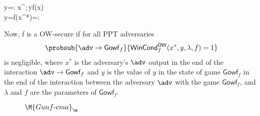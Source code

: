 \medskip

\hspace{1cm}
{\pcif y=\bot: x\sample\bin^\lambda;\,y\gets f(x)\\
\pcif y=f(x^*)=\lambda: \\
\pcelse {}
}

\medskip
\noindent
Now, f is a OW-secure if for all PPT adversaries
\[\probsub{\adv\rightarrow\mathsf{Gowf}_f}{\mathsf{WinCond}_f^\mathsf{OW}(x^*,y,\lambda,f)=1}\]
is negligible, where $x^*$ is the adversary's $\adv$ output in the end of the interaction $\adv\rightarrow\textsf{Gowf}_f$ and $y$ is the value of $y$ in the state of game $\mathsf{Gowf}_f$ in the end of the interaction
between the adversary $\adv$ with the game $\mathsf{Gowf}_f$, and $\lambda$ and $f$ are the parameters of $\mathsf{Gowf}_f$.

\begin{wrapfigure}{R}{0.215\textwidth}
\vspace{-0.7cm}
				\begin{pchstack}
\pchspace
				\begin{pcvstack}
          \underline{\underline{$\M{Gunf\text{-}cma}_\m$}}\\
          \\
          \pcvspace
          \pcvspace
          \pcvspace
        \end{pcvstack}
				\end{pchstack}
\vspace{-0.3cm}
\caption{\label{fig:search:unfcma}}
\vspace{-2cm}
\end{wrapfigure}


